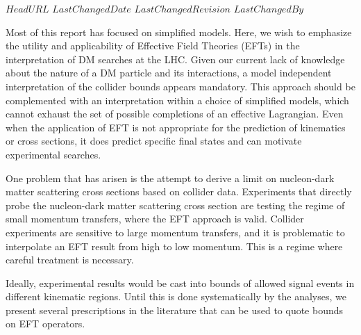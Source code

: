 \svnidlong
{$HeadURL$}
{$LastChangedDate$}
{$LastChangedRevision$}
{$LastChangedBy$}



Most of this report has focused on simplified models.
Here, we wish to emphasize the utility and applicability of
Effective Field Theories (EFTs) 
in the interpretation of DM searches at the LHC.
Given our current lack of knowledge about the nature of a DM particle and
its interactions, a model independent interpretation of the collider bounds
appears mandatory.  This approach should be complemented with
an interpretation within a choice of simplified models, which
cannot exhaust the set of possible completions of
an effective Lagrangian.
Even when the application of EFT is not appropriate for the prediction of kinematics or cross sections, it does predict specific final states and can motivate experimental searches.

One problem that has arisen is the attempt to derive a limit on
nucleon-dark matter scattering cross sections based on collider data.
Experiments that directly probe the nucleon-dark matter scattering cross section are testing the regime of small momentum transfers, where the EFT approach is valid.  Collider experiments are sensitive to large momentum transfers, and it is problematic to interpolate an EFT result from high to low momentum.  This is a regime where careful treatment is necessary.


Ideally, experimental results would be cast into bounds of allowed signal events in different kinematic regions.   Until this is done systematically by the analyses, we present
several prescriptions in the literature
that can be used to quote bounds on EFT operators.

